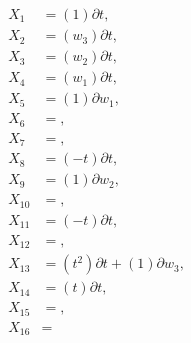 \begin{align*}
X_{1}&=\left( 1 \right)\partial t,\\
X_{2}&=\left( w_{3} \right)\partial t,\\
X_{3}&=\left( w_{2} \right)\partial t,\\
X_{4}&=\left( w_{1} \right)\partial t,\\
X_{5}&=\left( 1 \right)\partial w_{1},\\
X_{6}&=,\\
X_{7}&=,\\
X_{8}&=\left( - t \right)\partial t,\\
X_{9}&=\left( 1 \right)\partial w_{2},\\
X_{10}&=,\\
X_{11}&=\left( - t \right)\partial t,\\
X_{12}&=,\\
X_{13}&=\left( t^{2} \right)\partial t+\left( 1 \right)\partial w_{3},\\
X_{14}&=\left( t \right)\partial t,\\
X_{15}&=,\\
X_{16}&=\end{align*}
